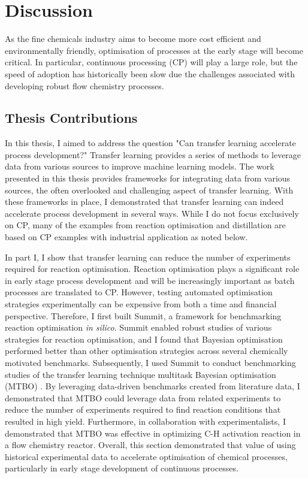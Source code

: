 \chapter{Discussion}\label{ch:discussion} 

As the fine chemicals industry aims to become more cost efficient and environmentally friendly, optimisation of processes at the early stage will become critical. In particular, continuous processing (CP) will play a large role, but the speed of adoption has historically been slow due the challenges associated with developing robust flow chemistry processes.

\section{Thesis Contributions}

In this thesis, I aimed to address the question "Can transfer learning accelerate process development?"  Transfer learning provides a series of methods to leverage data from various sources to improve machine learning models. The work presented in this thesis provides frameworks for integrating data from various sources, the often overlooked and challenging aspect of transfer learning. With these frameworks in place, I demonstrated that transfer learning can indeed accelerate process development in several ways. While I do not focus exclusively on CP, many of the examples from reaction optimisation and distillation are based on CP examples with industrial application as noted below.

In part I, I show that transfer learning can reduce the number of experiments required for reaction optimisation. Reaction optimisation plays a significant role in early stage process development and will be increasingly important as batch processes are translated to CP. However, testing automated optimisation strategies experimentally can be expensive from both a time and financial perspective.  Therefore, I first built Summit, a framework for benchmarking reaction optimisation \textit{in silico}. Summit enabled robust studies of various strategies for reaction optimisation, and I found that Bayesian optimisation performed better than other optimisation strategies across several chemically motivated benchmarks. Subsequently, I used Summit to conduct benchmarking studies of the transfer learning technique multitask Bayesian optimisation (MTBO) \cite{Swersky2013}. By leveraging data-driven benchmarks created from literature data, I demonstrated that MTBO could leverage data from related experiments to reduce the number of experiments required to find reaction conditions that resulted in high yield. Furthermore, in collaboration with experimentalists, I demonstrated that MTBO was effective in optimizing C-H activation reaction in a flow chemistry reactor.  Overall, this section demonstrated that value of using historical experimental data to accelerate optimisation of chemical processes, particularly in early stage development of continuous processes. 

